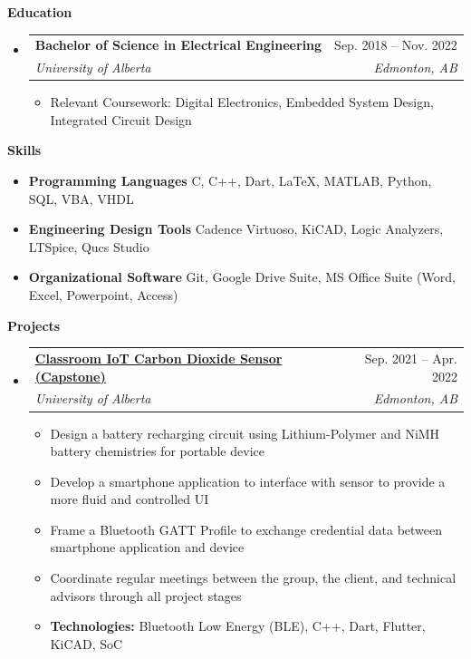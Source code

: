 \documentclass[letterpaper,12pt]{article}[leftmargin=*]
\makeatletter
\def \entryspacing {-0pt}
\renewcommand{\section}[2]{\vspace{5pt}
  \colorbox{secondary}{\color{white}\raggedbottom\normalsize\textbf{{#1}{\hspace{7pt}#2}}}
}
\newcommand{\resumeEntryStart}{\begin{itemize}[leftmargin=2.5mm]}
\newcommand{\resumeEntryEnd}{\end{itemize}\vspace{\entryspacing}}
\newcommand{\resumeItemListStart}{\begin{itemize}[leftmargin=4.5mm]}
\newcommand{\resumeItemListEnd}{\end{itemize}}
\newcommand{\resumeItem}[1]{
  \item\small{
    {#1 \vspace{-2pt}}
  }
}
\newcommand{\resumeEntryTSDL}[4]{
  \vspace{-1pt}\item[]
    \begin{tabularx}{0.97\textwidth}{X@{\hspace{60pt}}r}
      \textbf{\color{primary}#1} & {\firabook\color{accent}\small#2} \\
      \textit{\color{accent}\small#3} & \textit{\color{accent}\small#4} \\
    \end{tabularx}\vspace{-6pt}
}
\newcommand{\resumeEntryS}[2]{
  \item[]\small{
    \textbf{\color{primary}#1 }{ #2 \vspace{-6pt}}
  }
}
\makeatother
\begin{document}
\section{\faGraduationCap}{Education}

  \resumeEntryStart
    \resumeEntryTSDL
      {Bachelor of Science in Electrical Engineering}{Sep. 2018 -- Nov. 2022}
      {University of Alberta}{Edmonton, AB}
  \resumeItemListStart
    \resumeItem{Relevant Coursework: Digital Electronics, Embedded System Design, Integrated Circuit Design}
  \resumeItemListEnd
  \resumeEntryEnd

\section{\faGears}{Skills}

  \resumeEntryStart
   \resumeEntryS{Programming Languages } {C, C++, Dart, LaTeX, MATLAB, Python, SQL, VBA, VHDL}
   \resumeEntryS{Engineering Design Tools } {Cadence Virtuoso, KiCAD, Logic Analyzers, LTSpice, Qucs Studio}
   \resumeEntryS{Organizational Software } {Git, Google Drive Suite, MS Office Suite (Word, Excel, Powerpoint, Access)}
  \resumeEntryEnd

\section{\faFlask}{Projects}

  \resumeEntryStart
    \resumeEntryTSDL
      {\href{https://github.com/EE-Team10-Capstone}{\color{black}Classroom IoT Carbon Dioxide Sensor (Capstone)}}{Sep. 2021 -- Apr. 2022}
      {University of Alberta}{Edmonton, AB}
    \resumeItemListStart
      \resumeItem {Design a battery recharging circuit using Lithium-Polymer and NiMH battery chemistries for portable device}
      \resumeItem {Develop a smartphone application to interface with sensor to provide a more fluid and controlled UI}
      \resumeItem {Frame a Bluetooth GATT Profile to exchange credential data between smartphone application and device}
      \resumeItem {Coordinate regular meetings between the group, the client, and technical advisors through all project stages}
      \resumeItem {\textbf{Technologies:} Bluetooth Low Energy (BLE), C++, Dart, Flutter, KiCAD, SoC}
    \resumeItemListEnd
  \resumeEntryEnd
\end{document}
